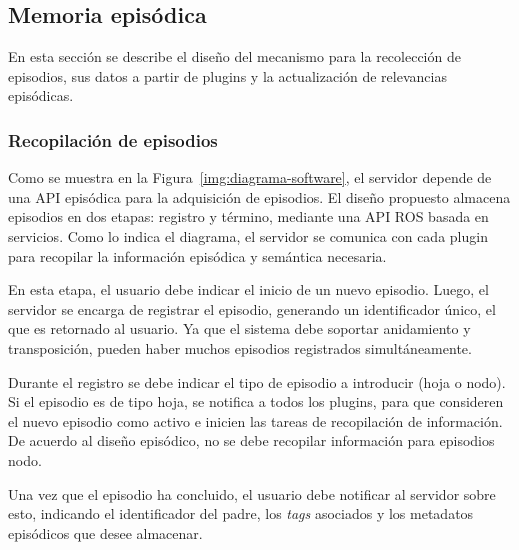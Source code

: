 \subsection{Memoria episódica}

En esta sección se describe el diseño del mecanismo para la recolección de episodios, sus datos a partir de plugins y la actualización de relevancias episódicas.

\subsubsection{Recopilación de episodios}

Como se muestra en la Figura~\ref{img:diagrama-software}, el servidor depende de una API episódica para la adquisición de episodios. El diseño propuesto almacena episodios en dos etapas: registro y término, mediante una API ROS basada en servicios. Como lo indica el diagrama, el servidor se comunica con cada plugin para recopilar la información episódica y semántica necesaria.

En esta etapa, el usuario debe indicar el inicio de un nuevo episodio. Luego, el servidor se encarga de registrar el episodio, generando un identificador único, el que es retornado al usuario. Ya que el sistema debe soportar anidamiento y transposición, pueden haber muchos episodios registrados simultáneamente. 

Durante el registro se debe indicar el tipo de episodio a introducir (hoja o nodo). Si el episodio es de tipo hoja, se notifica a todos los plugins, para que consideren el nuevo episodio como activo e inicien las tareas de recopilación de información. De acuerdo al diseño episódico, no se debe recopilar información para episodios nodo.

Una vez que el episodio ha concluido, el usuario debe notificar al servidor sobre esto, indicando el identificador del padre, los \textit{tags} asociados y los metadatos episódicos que desee almacenar.


